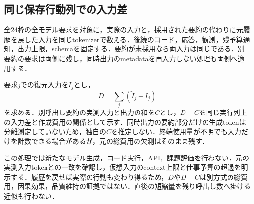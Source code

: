 \subsection{同じ保存行動列での入力差}
全24枠の全モデル要求を対象に，実際の入力と，採用された要約の代わりに元履歴を戻した入力を同じtokenizerで数える．後続のコード，応答，観測，残予算通知，出力上限，schemaを固定する．要約が未採用なら両入力は同じである．別要約の要求は両側に残し，同時出力のmetadataを再入力しない処理も両側へ適用する．

要求$j$での復元入力を$\widetilde I_j$とし，
\begin{equation}
 D=\sum_j(\widetilde I_j-I_j)
\end{equation}
を求める．別呼出し要約の実測入力と出力の和を$C$とし，$D-C$を同じ実行列上の入力差と作成費用の関係として示す．同時出力の要約部分だけの生成tokenは分離測定していないため，独自の$C$を推定しない．終端使用量が不明でも入力だけを計数できる場合があるが，元の総費用の欠測はそのまま残す．

この処理では新たなモデル生成，コード実行，API，課題評価を行わない．元の実測入力tokenとの一致を確認し，仮想入力のcontext上限と仕事予算の超過を明示する．履歴を戻せば実際の行動も変わり得るため，$D$や$D-C$は別方式の総費用，因果効果，品質維持の証拠ではない．直後の短縮量を残り呼出し数へ掛ける近似も行わない．
